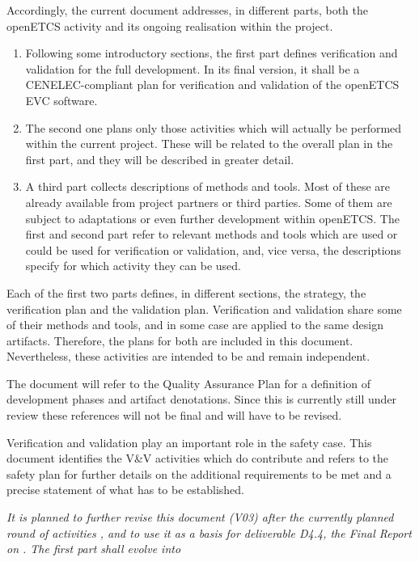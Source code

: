 \documentclass{../template/openetcs_report}
\begin{document}
Accordingly, the current document addresses, in different parts, both
the openETCS activity and its ongoing realisation within the project.

\begin{enumerate}
\item Following some introductory sections, the first part defines
  verification and validation for the full development. In its final
  version, it shall be a  CENELEC-compliant plan
  for verification and validation of the openETCS EVC software.
\item The second one plans only those activities which will actually
  be performed within the current project. These will be related to
  the overall plan in the first part, and they will be described in
  greater detail.
\item A third part collects descriptions of methods and tools. Most of
  these are already available from project partners or third
  parties. Some of them are subject to adaptations or even further
  development within openETCS. The first and second part refer to
  relevant methods and tools which are used or could be used for
  verification or validation, and, vice versa, the descriptions
  specify for which activity they can be used.
\end{enumerate}
  
Each of the first two parts defines, in different sections, the \vv
strategy, the verification plan and the validation plan. Verification
and validation share some of their methods and tools, and in some case
are applied to the same design artifacts. Therefore, the plans for
both are included in this document. Nevertheless, these activities are
intended to be and remain independent.

The document will refer to the Quality Assurance Plan \cite{QAplan}
for a definition of development phases and artifact denotations. Since
this is currently still under review these references will not be
final and will have to be revised.

Verification and validation play an important role in the safety
case. This document identifies the V\&V activities which do contribute
and refers to the safety plan for further details on the additional
requirements to be met and a precise statement of what has to be
established.

  
\textit{It is planned to further revise this document (V03) after the
currently planned round of \vv activities , and to
use it as a basis for deliverable D4.4, the Final Report on \VV. The
first part shall evolve into }
\end{document}
